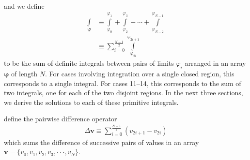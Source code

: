\documentclass[modern]{aastex62}
\newcommand{\BS}[1]{\ensuremath{\pmb{#1}}}
\begin{document}
%
\\[1em]
%
and we define
%
\begin{align}
    \int\limits_{\BS{\varphi}} & \equiv
    \int\limits_{\varphi_{0}}^{\varphi_{1}}
    +
    \int\limits_{\varphi_{2}}^{\varphi_{3}}
    +
    \cdots
    +
    \int\limits_{\varphi_{N - 2}}^{\varphi_{N - 1}}
    \nonumber                           \\
                               & \equiv
    \sum_{i = 0}^{\frac{N - 1}{2}}
    \int\limits_{\varphi_{2i}}^{\varphi_{2i+1}}
\end{align}
%
to be the sum of definite integrals between pairs of limits $\varphi_i$
arranged in an array $\BS{\varphi}$ of length $N$.
For cases involving integration over a single closed region, this
corresponds to a single integral. For cases 11--14, this corresponds to
the sum of two integrals, one for each of the two disjoint regions.
In the next three sections, we derive the solutions to each of these
primitive integrals.

 define the pairwise difference operator
%
\begin{align}
    \label{eq:pairdiff}
    \Delta \BS{v} \equiv \sum_{i=0}^{\frac{N - 1}{2}}
    \left( v_{2i + 1} - v_{2i} \right)
\end{align}
%
which sums the difference of successive pairs of values in
an array $\BS{v} = \{ v_0, v_1, v_2, v_3, {\cdot\cdot\cdot}, v_N\}$.
\end{document}
